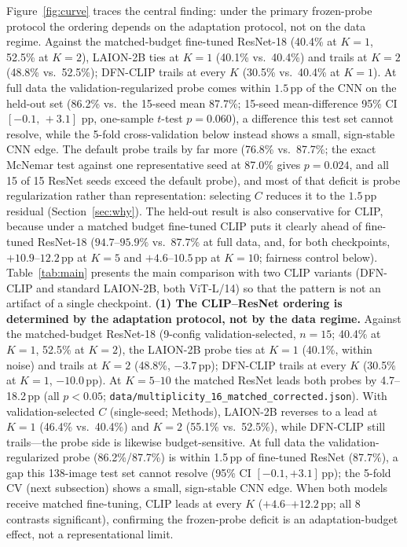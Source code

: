 \documentclass[10pt,a4paper]{article}
\begin{document}
Figure~\ref{fig:curve} traces the central finding: under the primary frozen-probe protocol the ordering depends on the adaptation protocol, not on the data regime. Against the matched-budget fine-tuned ResNet-18 (40.4\% at $K{=}1$, 52.5\% at $K{=}2$), LAION-2B ties at $K{=}1$ (40.1\% vs.\ 40.4\%) and trails at $K{=}2$ (48.8\% vs.\ 52.5\%); DFN-CLIP trails at every $K$ (30.5\% vs.\ 40.4\% at $K{=}1$). At full data the validation-regularized probe comes within $1.5$\,pp of the CNN on the held-out set (86.2\% vs.\ the 15-seed mean 87.7\%; 15-seed mean-difference 95\% CI $[-0.1,\,+3.1]$ pp, one-sample $t$-test $p=0.060$), a difference this test set cannot resolve, while the 5-fold cross-validation below instead shows a small, sign-stable CNN edge. The default probe trails by far more (76.8\% vs.\ 87.7\%; the exact McNemar test against one representative seed at 87.0\% gives $p=0.024$, and all 15 of 15 ResNet seeds exceed the default probe), and most of that deficit is probe regularization rather than representation: selecting $C$ reduces it to the $1.5$\,pp residual (Section~\ref{sec:why}). The held-out result is also conservative for CLIP, because under a matched budget fine-tuned CLIP puts it clearly ahead of fine-tuned ResNet-18 ($94.7$--$95.9\%$ vs.\ $87.7\%$ at full data, and, for both checkpoints, $+10.9$--$12.2$\,pp at $K{=}5$ and $+4.6$--$10.5$\,pp at $K{=}10$; fairness control below).
Table~\ref{tab:main} presents the main comparison with two CLIP variants (DFN-CLIP and standard LAION-2B, both ViT-L/14) so that the pattern is not an artifact of a single checkpoint.
\textbf{(1) The CLIP--ResNet ordering is determined by the adaptation protocol, not by the data regime.} Against the matched-budget ResNet-18 (9-config validation-selected, $n{=}15$; 40.4\% at $K{=}1$, 52.5\% at $K{=}2$), the LAION-2B probe ties at $K{=}1$ (40.1\%, within noise) and trails at $K{=}2$ (48.8\%, $-3.7$\,pp); DFN-CLIP trails at every $K$ (30.5\% at $K{=}1$, $-10.0$\,pp). At $K{=}5$--$10$ the matched ResNet leads both probes by 4.7--18.2\,pp (all $p<0.05$; \texttt{data/multiplicity\_16\_matched\_corrected.json}). With validation-selected $C$ (single-seed; Methods), LAION-2B reverses to a lead at $K{=}1$ (46.4\% vs.\ 40.4\%) and $K{=}2$ (55.1\% vs.\ 52.5\%), while DFN-CLIP still trails---the probe side is likewise budget-sensitive. At full data the validation-regularized probe (86.2\%/87.7\%) is within 1.5\,pp of fine-tuned ResNet (87.7\%), a gap this 138-image test set cannot resolve (95\% CI $[-0.1,+3.1]$\,pp); the 5-fold CV (next subsection) shows a small, sign-stable CNN edge. When both models receive matched fine-tuning, CLIP leads at every $K$ ($+4.6$--$+12.2$\,pp; all 8 contrasts significant), confirming the frozen-probe deficit is an adaptation-budget effect, not a representational limit.
\end{document}
